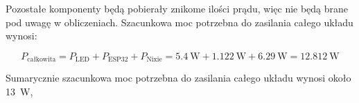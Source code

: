 \documentclass[../main.tex]{subfiles}
\begin{document}
Pozostałe komponenty będą pobierały znikome ilości prądu, więc nie będą brane pod uwagę w obliczeniach.
Szacunkowa moc potrzebna do zasilania całego układu wynosi:

\begin{equation}
    P_{\text{całkowita}} = P_{\text{LED}} + P_{\text{ESP32}} + P_{\text{Nixie}} = \SI{5.4}{\watt} + \SI{1.122}{\watt} + \SI{6.29}{\watt} = \SI{12.812}{\watt}
\end{equation}

Sumarycznie szacunkowa moc potrzebna do zasilania całego układu wynosi około \SI{13}{\watt}, 
\end{document}
